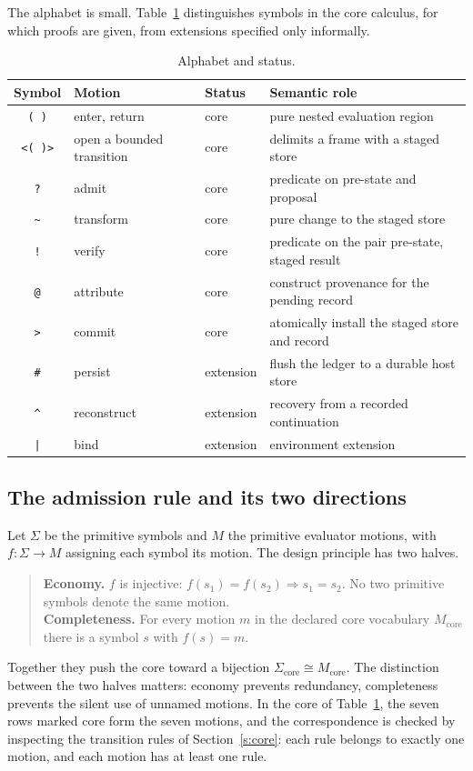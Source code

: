 \documentclass[11pt]{article}
\newcommand{\code}[1]{\texttt{#1}}
\begin{document}
The alphabet is small. Table~\ref{tab:alpha} distinguishes symbols in the core calculus, for which proofs are given, from extensions specified only informally.

\begin{table}[h]
\centering
\small
\begin{tabular}{@{}clll@{}}
\toprule
Symbol & Motion & Status & Semantic role \\
\midrule
\code{( )} & enter, return & core & pure nested evaluation region \\
\code{<( )>} & open a bounded transition & core & delimits a frame with a staged store \\
\code{?} & admit & core & predicate on pre-state and proposal \\
\code{\~{}} & transform & core & pure change to the staged store \\
\code{!} & verify & core & predicate on the pair pre-state, staged result \\
\code{@} & attribute & core & construct provenance for the pending record \\
\code{>} & commit & core & atomically install the staged store and record \\
\code{\#} & persist & extension & flush the ledger to a durable host store \\
\code{\^{}} & reconstruct & extension & recovery from a recorded continuation \\
\code{|} & bind & extension & environment extension \\
\bottomrule
\end{tabular}
\caption{Alphabet and status.}
\label{tab:alpha}
\end{table}

\subsection{The admission rule and its two directions}

Let $\Sigma$ be the primitive symbols and $M$ the primitive evaluator motions, with $f:\Sigma\to M$ assigning each symbol its motion. The design principle has two halves.

\begin{quote}
\textbf{Economy.} $f$ is injective: $f(s_1)=f(s_2)\Rightarrow s_1=s_2$. No two primitive symbols denote the same motion.\\[2pt]
\textbf{Completeness.} For every motion $m$ in the declared core vocabulary $M_{\mathrm{core}}$ there is a symbol $s$ with $f(s)=m$.
\end{quote}
Together they push the core toward a bijection $\Sigma_{\mathrm{core}}\cong M_{\mathrm{core}}$. The distinction between the two halves matters: economy prevents redundancy, completeness prevents the silent use of unnamed motions. In the core of Table~\ref{tab:alpha}, the seven rows marked core form the seven motions, and the correspondence is checked by inspecting the transition rules of Section~\ref{s:core}: each rule belongs to exactly one motion, and each motion has at least one rule.
\end{document}
